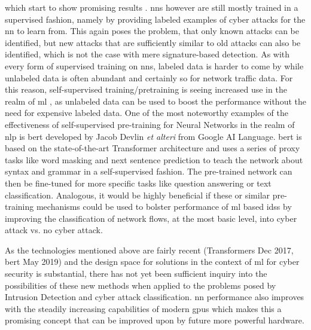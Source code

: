 which start to show promising results . \glspl{nn} however are still mostly trained in a supervised fashion, namely by providing labeled examples of cyber attacks for the \gls{nn} to learn from. This again poses the problem, that only known attacks can be identified, but new attacks that are sufficiently similar to old attacks can also be identified, which is not the case with mere signature-based detection. As with every form of supervised training on \glspl{nn}, labeled data is harder to come by while unlabeled data is often abundant and certainly so for network traffic data. For this reason, self-supervised training/pretraining is seeing increased use in the realm of \gls{ml} , as unlabeled data can be used to boost the performance without the need for expensive labeled data. One of the most noteworthy examples of the effectiveness of self-supervised pre-training for Neural Networks in the realm of \gls{nlp} is \gls{bert} \cite{bert} developed by Jacob Devlin \textit{et alteri} from Google AI Language. \gls{bert} is based on the state-of-the-art Transformer architecture \cite{attention} and uses a series of proxy tasks like word masking and next sentence prediction to teach the network about syntax and grammar in a self-supervised fashion. The pre-trained network can then be fine-tuned for more specific tasks like question answering or text classification. Analogous, it would be highly beneficial if these or similar pre-training mechanisms could be used to bolster performance of \gls{ml} based \glspl{ids} by improving the classification of network flows, at the most basic level, into cyber attack vs. no cyber attack. \par
As the technologies mentioned above are fairly recent (Transformers Dec 2017, \gls{bert} May 2019) and the design space for solutions in the context of \gls{ml} for cyber security is substantial, there has not yet been sufficient inquiry into the possibilities of these new methods when applied to the problems posed by Intrusion Detection and cyber attack classification. \gls{nn} performance also improves with the steadily increasing capabilities of modern \glspl{gpu} which makes this a promising concept that can be improved upon by future more powerful hardware. 



